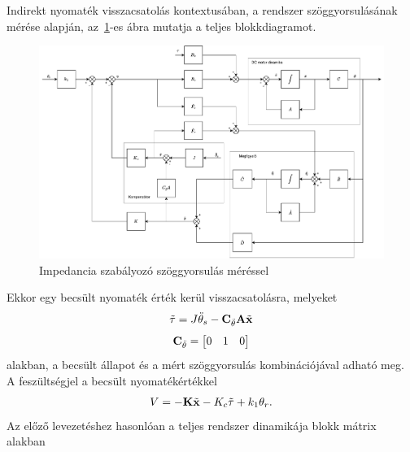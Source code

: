 Indirekt nyomaték visszacsatolás kontextusában, a rendszer szöggyorsulásának mérése alapján,
az~\ref{fig:block_diagram_indirect_compensation}-es ábra mutatja a teljes blokkdiagramot.
\begin{figure}[ht]
    \begin{center}
    \includegraphics[width=\textwidth]{images/compensated_position_controller_angular_acceleration.pdf}
    \caption{Impedancia szabályozó szöggyorsulás méréssel}\label{fig:block_diagram_indirect_compensation}
    \end{center}
\end{figure}
Ekkor egy becsült nyomaték érték kerül visszacsatolásra, melyeket
\begin{align}
    \tilde \tau = J \ddot \theta_s - \mathbf{C}_{\ddot\theta} \mathbf{A} \tilde{\mathbf{x}}
\end{align}
\begin{align}
    \mathbf{C}_{\ddot\theta} = 
    \begin{bmatrix}
        0 & 1 & 0
    \end{bmatrix}
\end{align}
alakban, a becsült állapot és a mért szöggyorsulás kombinációjával adható meg.
A feszültségjel a becsült nyomatékértékkel
\begin{align}
    V = -\mathbf{K} \tilde{\mathbf{x}} -K_c \tilde \tau + k_1 \theta_r.
\end{align}
Az előző levezetéshez hasonlóan a teljes rendszer dinamikája blokk mátrix alakban
